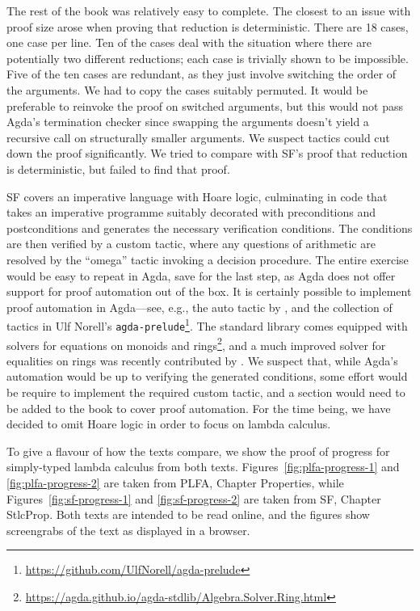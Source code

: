 \documentclass[preprint,authoryear]{elsarticle}
\begin{document}
The rest of the book was relatively easy to complete.  The closest to
an issue with proof size arose when proving that reduction is
deterministic.  There are 18 cases, one case per line.  Ten of the
cases deal with the situation where there are potentially two
different reductions; each case is trivially shown to be
impossible.  Five of the ten cases are redundant, as they just involve
switching the order of the arguments.  We had to copy the cases
suitably permuted. It would be preferable to reinvoke the proof on
switched arguments, but this would not pass Agda's termination checker
since swapping the arguments doesn't yield a recursive call on
structurally smaller arguments.  We suspect tactics could cut down the
proof significantly. We tried to compare with SF's proof that reduction
is deterministic, but failed to find that proof.

SF covers an imperative language with Hoare logic, culminating in code that
takes an imperative programme suitably decorated with preconditions and
postconditions and generates the necessary verification conditions. The
conditions are then verified by a custom tactic, where any questions of
arithmetic are resolved by the ``omega'' tactic invoking a decision procedure.
The entire exercise would be easy to repeat in Agda, save for the last step, as
Agda does not offer support for proof automation out of the box. It is
certainly possible to implement proof automation in Agda---see, e.g., the auto
tactic by \citet{Kokke-2015}, and the collection of tactics in Ulf Norell's
\texttt{agda-prelude}\footnote{\url{https://github.com/UlfNorell/agda-prelude}}.
The standard library comes equipped with solvers for equations on monoids and
rings\footnote{\url{https://agda.github.io/agda-stdlib/Algebra.Solver.Ring.html}},
and a much improved solver for equalities on rings was recently contributed by
\citet{Kidney-2019}.
We suspect that, while Agda's automation would be up to verifying the generated
conditions, some effort would be require to implement the required custom
tactic, and a section would need to be added to the book to cover proof
automation. For the time being, we have decided to omit Hoare logic in order to
focus on lambda calculus.

To give a flavour of how the texts compare, we show the
proof of progress for simply-typed lambda calculus from both texts.
Figures~\ref{fig:plfa-progress-1} and \ref{fig:plfa-progress-2}
are taken from PLFA, Chapter Properties,
while Figures~\ref{fig:sf-progress-1} and \ref{fig:sf-progress-2}
are taken from SF, Chapter StlcProp.
Both texts are intended to be read online,
and the figures show screengrabs of the text as
displayed in a browser.
\end{document}
